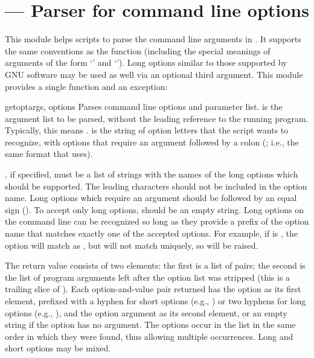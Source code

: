 \section{ ---
         Parser for command line options}



This module helps scripts to parse the command line arguments in
.
It supports the same conventions as the \UNIX{} 
function (including the special meanings of arguments of the form
`\code{-}' and `\code{-}\code{-}').
Long options similar to those supported by
GNU software may be used as well via an optional third argument.
This module provides a single function and an exception:

\begin{funcdesc}{getopt}{args, options}
Parses command line options and parameter list.   is the
argument list to be parsed, without the leading reference to the
running program. Typically, this means .
 is the string of option letters that the script wants to
recognize, with options that require an argument followed by a colon
(\character{:}; i.e., the same format that \UNIX{}
 uses).


, if specified, must be a list of strings with the
names of the long options which should be supported.  The leading
 characters should not be included in the option
name.  Long options which require an argument should be followed by an
equal sign (\character{=}).  To accept only long options,
 should be an empty string.  Long options on the command
line can be recognized so long as they provide a prefix of the option
name that matches exactly one of the accepted options.  For example,
if  is , the option
 will match as , but
 will not match uniquely, so 
will be raised.

The return value consists of two elements: the first is a list of
 pairs; the second is the list of
program arguments left after the option list was stripped (this is a
trailing slice of ).  Each option-and-value pair returned
has the option as its first element, prefixed with a hyphen for short
options (e.g., ) or two hyphens for long options (e.g.,
), and the option argument as its second
element, or an empty string if the option has no argument.  The
options occur in the list in the same order in which they were found,
thus allowing multiple occurrences.  Long and short options may be
mixed.
\end{funcdesc}


